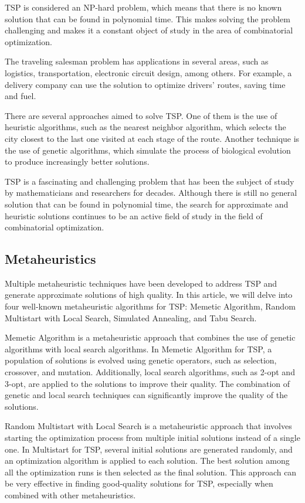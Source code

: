 \documentclass[conference]{IEEEtran}
\begin{document}
    TSP is considered an NP-hard problem, which means that there is no known solution that can be found in polynomial time. This makes solving the problem challenging and makes it a constant object of study in the area of combinatorial optimization.

    The traveling salesman problem has applications in several areas, such as logistics, transportation, electronic circuit design, among others. For example, a delivery company can use the solution to optimize drivers' routes, saving time and fuel.

    There are several approaches aimed to solve TSP. One of them is the use of heuristic algorithms, such as the nearest neighbor algorithm, which selects the city closest to the last one visited at each stage of the route. Another technique is the use of genetic algorithms, which simulate the process of biological evolution to produce increasingly better solutions.

    TSP is a fascinating and challenging problem that has been the subject of study by mathematicians and researchers for decades. Although there is still no general solution that can be found in polynomial time, the search for approximate and heuristic solutions continues to be an active field of study in the field of combinatorial optimization.

    \subsection{Metaheuristics}

    Multiple metaheuristic techniques have been developed to address TSP and generate approximate solutions of high quality. In this article, we will delve into four well-known metaheuristic algorithms for TSP: Memetic Algorithm, Random Multistart with Local Search, Simulated Annealing, and Tabu Search.

    Memetic Algorithm is a metaheuristic approach that combines the use of genetic algorithms with local search algorithms. In Memetic Algorithm for TSP, a population of solutions is evolved using genetic operators, such as selection, crossover, and mutation. Additionally, local search algorithms, such as 2-opt and 3-opt, are applied to the solutions to improve their quality. The combination of genetic and local search techniques can significantly improve the quality of the solutions.

    Random Multistart with Local Search is a metaheuristic approach that involves starting the optimization process from multiple initial solutions instead of a single one. In Multistart for TSP, several initial solutions are generated randomly, and an optimization algorithm is applied to each solution. The best solution among all the optimization runs is then selected as the final solution. This approach can be very effective in finding good-quality solutions for TSP, especially when combined with other metaheuristics.
\end{document}
